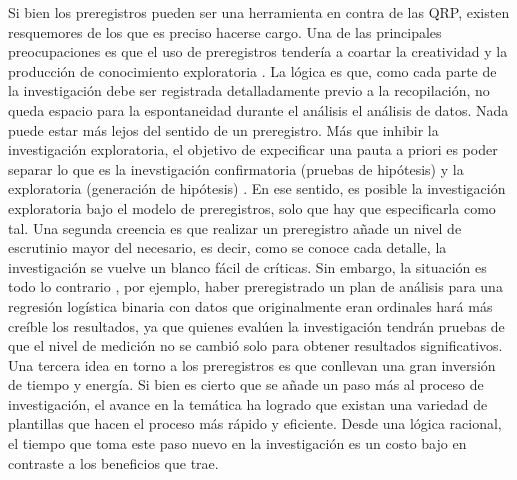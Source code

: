 \documentclass[
]{book}
\begin{document}
Si bien los preregistros pueden ser una herramienta en contra de las QRP, existen resquemores de los que es preciso hacerse cargo. Una de las principales preocupaciones es que el uso de preregistros tendería a coartar la creatividad y la producción de conocimiento exploratoria \citep{moore_Preregister_2016}. La lógica es que, como cada parte de la investigación debe ser registrada detalladamente previo a la recopilación, no queda espacio para la espontaneidad durante el análisis el análisis de datos. Nada puede estar más lejos del sentido de un preregistro. Más que inhibir la investigación exploratoria, el objetivo de expecificar una pauta a priori es poder separar lo que es la inevstigación confirmatoria (pruebas de hipótesis) y la exploratoria (generación de hipótesis) \citep{nosek_preregistration_2018}. En ese sentido, es posible la investigación exploratoria bajo el modelo de preregistros, solo que hay que especificarla como tal. Una segunda creencia es que realizar un preregistro añade un nivel de escrutinio mayor del necesario, es decir, como se conoce cada detalle, la investigación se vuelve un blanco fácil de críticas. Sin embargo, la situación es todo lo contrario \citep{moore_Preregister_2016}, por ejemplo, haber preregistrado un plan de análisis para una regresión logística binaria con datos que originalmente eran ordinales hará más creíble los resultados, ya que quienes evalúen la investigación tendrán pruebas de que el nivel de medición no se cambió solo para obtener resultados significativos. Una tercera idea en torno a los preregistros es que conllevan una gran inversión de tiempo y energía. Si bien es cierto que se añade un paso más al proceso de investigación, el avance en la temática ha logrado que existan una variedad de plantillas que hacen el proceso más rápido y eficiente. Desde una lógica racional, el tiempo que toma este paso nuevo en la investigación es un costo bajo en contraste a los beneficios que trae.
\end{document}
